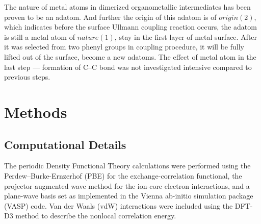 \documentclass[%
 reprint,
 amsmath,amssymb,
 aps,
prb,
]{revtex4-2}
\begin{document}
The nature of metal atoms in dimerized organometallic intermediates has been proven to be an adatom. And further the origin of this adatom is of $origin(2)$, which indicates before the surface Ullmann coupling reaction occurs, the adatom is still a metal atom of $nature(1)$, stay in the first layer of metal surface. After it was selected from two phenyl groups in coupling procedure, it will be fully lifted out of the surface, become a new adatoms. The effect of metal atom in the last step --- formation of C--C bond was not investigated intensive compared to previous steps.



\section{Methods}



\subsection{Computational Details}

The periodic Density Functional Theory calculations were performed using the Perdew–Burke-Ernzerhof (PBE) for the exchange-correlation functional, the projector augmented wave method for the ion-core electron interactions, and a plane-wave basis set as implemented in the Vienna ab-initio simulation package (VASP) code. Van der Waals (vdW) interactions were included using the DFT-D3 method to describe the nonlocal correlation energy. 
\end{document}
